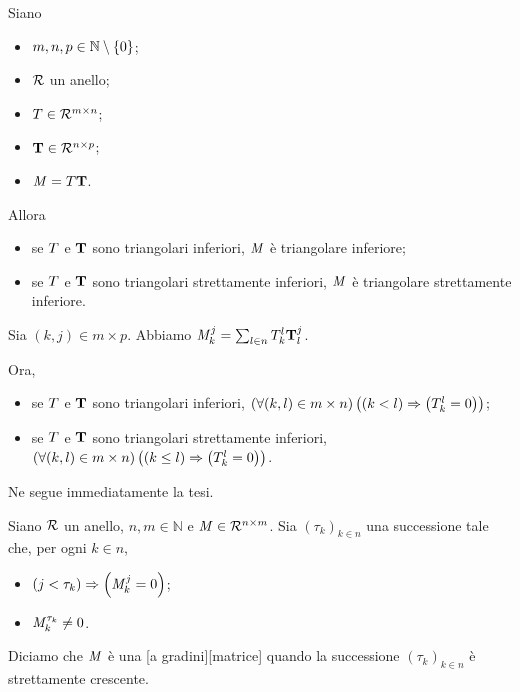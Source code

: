 \begin{Theorem}
  Siano
  \begin{itemize}
    \item $m, n, p \in \mathbb{N} \setminus \lbrace 0 \rbrace$;
    \item $\mathcal{R}$ un anello;
    \item $T \in \mathcal{R}^{m \times n}$;
    \item $\mathbf{T} \in \mathcal{R}^{n \times p}$;
    \item $\mathit{M} = T\mathbf{T}$.
  \end{itemize}
  Allora
  \begin{itemize}
    \item se $T$ e $\mathbf{T}$ sono triangolari
      inferiori, $\mathit{M}$ \`e triangolare inferiore;
    \item se $T$ e $\mathbf{T}$ sono triangolari
      strettamente inferiori, $\mathit{M}$ \`e triangolare strettamente inferiore.
  \end{itemize}
\end{Theorem}
\Proof Sia $(k,j) \in m \times p$. Abbiamo
$\mathit{M}_k^j
= \sum_{l \in n} T_k^l \mathbf{T}_l^j$.
\par Ora,
\begin{itemize}
  \item se $T$ e $\mathbf{T}$ sono triangolari
    inferiori,
    $\left ( \forall (k,l) \in m \times n \right ) \left ( 
      \left ( k < l \right ) \Rightarrow \left ( T_k^l = 0 \right ) \right )$;
  \item se $T$ e $\mathbf{T}$ sono triangolari
    strettamente inferiori,
    $\left ( \forall (k,l) \in m \times n \right ) \left ( 
      \left ( k \leq l \right ) \Rightarrow \left ( T_k^l = 0 \right ) \right )$.
\end{itemize}
\par Ne segue immediatamente la tesi. \EndProof
\begin{Definition}
	Siano $\mathcal{R}$ un anello, $n, m \in \mathbb{N}$ e $\mathit{M} \in \mathcal{R}^{n \times m}$.
  Sia $(\tau_k)_{k \in n}$ una successione tale che, per ogni $k \in n$,
  \begin{itemize}
    \item $\left ( j < \tau_k \right ) \Rightarrow \left ( \mathit{M}_k^j = 0 \right )$;
    \item $\mathit{M}_k^{\tau_k} \neq 0$.
  \end{itemize}
  Diciamo che $\mathit{M}$ \`e una
  [a gradini][matrice]
  quando la successione $(\tau_k)_{k \in n}$ \`e strettamente crescente.
\end{Definition}
